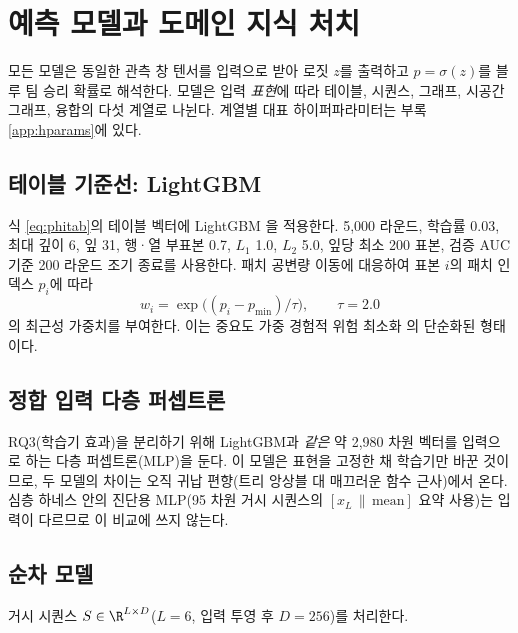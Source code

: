 \chapter{예측 모델과 도메인 지식 처치}
\label{ch:models}

모든 모델은 동일한 관측 창 텐서를 입력으로 받아 로짓 $z$를 출력하고 $p = \sigma(z)$를 블루 팀 승리 확률로 해석한다. 모델은 입력 \emph{표현}에 따라 테이블, 시퀀스, 그래프, 시공간 그래프, 융합의 다섯 계열로 나뉜다. 계열별 대표 하이퍼파라미터는 부록 \ref{app:hparams}에 있다.

\section{테이블 기준선: LightGBM}
\label{sec:model-lgbm}

식 \eqref{eq:phitab}의 테이블 벡터에 LightGBM \cite{ke2017lightgbm}을 적용한다. 5{,}000 라운드, 학습률 0.03, 최대 깊이 6, 잎 31, 행·열 부표본 0.7, $L_1$ 1.0, $L_2$ 5.0, 잎당 최소 200 표본, 검증 AUC 기준 200 라운드 조기 종료를 사용한다. 패치 공변량 이동에 대응하여 표본 $i$의 패치 인덱스 $p_i$에 따라
\begin{equation}
  w_i = \exp\!\big((p_i - p_{\min})/\tau\big), \qquad \tau = 2.0
\end{equation}
의 최근성 가중치를 부여한다. 이는 중요도 가중 경험적 위험 최소화 \cite{shimodaira2000improving}의 단순화된 형태이다.

\section{정합 입력 다층 퍼셉트론}
\label{sec:model-mlp}

RQ3(학습기 효과)을 분리하기 위해 LightGBM과 \emph{같은} 약 2{,}980 차원 벡터를 입력으로 하는 다층 퍼셉트론(MLP)을 둔다. 이 모델은 표현을 고정한 채 학습기만 바꾼 것이므로, 두 모델의 차이는 오직 귀납 편향(트리 앙상블 대 매끄러운 함수 근사)에서 온다. 심층 하네스 안의 진단용 MLP(95 차원 거시 시퀀스의 $[x_L \,\|\, \mathrm{mean}]$ 요약 사용)는 입력이 다르므로 이 비교에 쓰지 않는다.

\section{순차 모델}
\label{sec:model-seq}

거시 시퀀스 $S \in \R^{L \times D}$($L=6$, 입력 투영 후 $D = 256$)를 처리한다.

